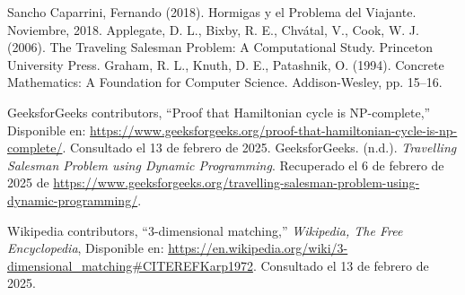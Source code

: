 \documentclass[twocolumn, fontsize=10pt]{article}
\theoremstyle{definition} %
\begin{document}
\begin{thebibliography}{}

  \sloppypar
   Sancho Caparrini, Fernando (2018). Hormigas y el Problema del Viajante. Noviembre, 2018.  
   Applegate, D. L., Bixby, R. E., Chvátal, V.,  Cook, W. J. (2006). The Traveling Salesman Problem: A Computational Study. Princeton University Press.  
   Graham, R. L., Knuth, D. E., Patashnik, O. (1994). Concrete Mathematics: A Foundation for Computer Science. Addison-Wesley, pp. 15--16.

GeeksforGeeks contributors, ``Proof that Hamiltonian cycle is NP-complete,''  
Disponible en: \url{https://www.geeksforgeeks.org/proof-that-hamiltonian-cycle-is-np-complete/}.  
Consultado el 13 de febrero de 2025.
 GeeksforGeeks. (n.d.). \textit{Travelling Salesman Problem using Dynamic Programming}. Recuperado el 6 de febrero de 2025 de \url{https://www.geeksforgeeks.org/travelling-salesman-problem-using-dynamic-programming/}.

Wikipedia contributors, ``3-dimensional matching,'' \textit{Wikipedia, The Free Encyclopedia}, 
Disponible en: \url{https://en.wikipedia.org/wiki/3-dimensional_matching#CITEREFKarp1972}.  Consultado el 13 de febrero de 2025.

\end{thebibliography}
\end{document}
